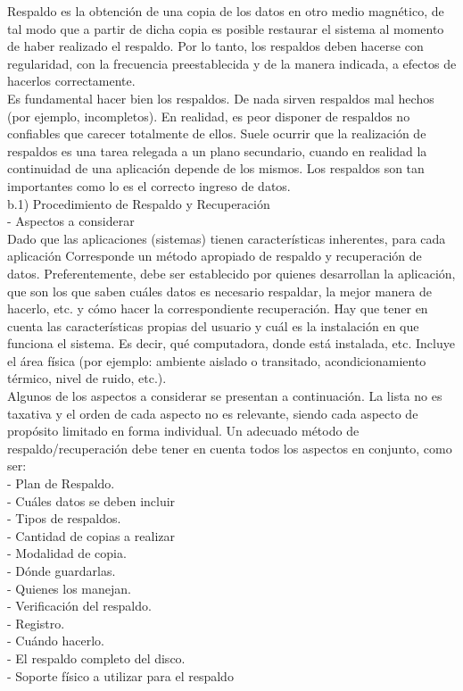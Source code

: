 \documentclass[12pt,letterpaper]{article}
\begin{document}
Respaldo es la obtención de una copia de los datos en otro medio magnético, de tal modo que a partir de dicha copia es posible restaurar el sistema al momento de haber realizado el respaldo. Por lo tanto, los respaldos deben hacerse con regularidad, con la frecuencia preestablecida y de la manera indicada, a efectos de hacerlos correctamente. \\

Es fundamental hacer bien los respaldos. De nada sirven respaldos mal hechos (por ejemplo, incompletos). En realidad, es peor disponer de respaldos no confiables que carecer totalmente de ellos. Suele ocurrir que la realización de respaldos es una tarea relegada a un plano secundario, cuando en realidad la continuidad de una aplicación depende de los mismos. Los respaldos son tan importantes como lo es el correcto ingreso de datos. \\

b.1) Procedimiento de Respaldo y Recuperación \\
 
- Aspectos a considerar \\
Dado que las aplicaciones (sistemas) tienen características inherentes, para cada aplicación
Corresponde un método apropiado de respaldo y recuperación de datos. Preferentemente, debe ser establecido por quienes desarrollan la aplicación, que son los que saben cuáles datos es necesario respaldar, la mejor manera de hacerlo, etc. y cómo hacer la correspondiente recuperación. Hay que tener en cuenta las características propias del usuario y cuál es la instalación en que funciona el sistema. Es decir, qué computadora, donde está instalada, etc. Incluye el área física (por ejemplo: ambiente aislado o transitado, acondicionamiento térmico, nivel de ruido, etc.).  \\
Algunos de los aspectos a considerar se presentan a continuación. La lista no es taxativa y el orden de cada aspecto no es relevante, siendo cada aspecto de propósito limitado en forma individual. Un adecuado método de respaldo/recuperación debe tener en cuenta todos los aspectos en conjunto, como ser:  \\
- Plan de Respaldo. \\
- Cuáles datos se deben incluir  \\
- Tipos de respaldos.  \\
- Cantidad de copias a realizar \\
- Modalidad de copia. \\
- Dónde guardarlas. \\
- Quienes los manejan. \\
- Verificación del respaldo. \\
- Registro. \\
- Cuándo hacerlo. \\
- El respaldo completo del disco. \\
- Soporte físico a utilizar para el respaldo  \\
\end{document}
